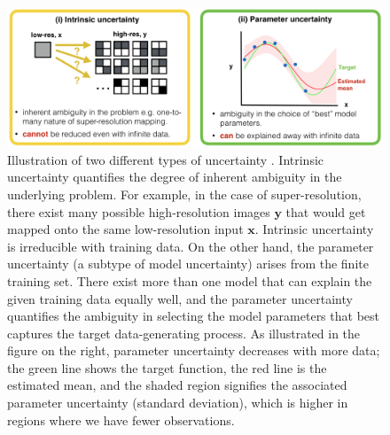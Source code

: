 \begin{figure}[t]
	\includegraphics[width=0.95\linewidth]{chapter_3/figures/fig_intro.png}
	\centering	
	\caption{Illustration of two different types of uncertainty \cite{hora1996aleatory}. Intrinsic uncertainty \cite{wang1996intrinsic} quantifies the degree of inherent ambiguity in the underlying problem. For example, in the case of super-resolution, there exist many possible high-resolution images $\textbf{y}$ that would get mapped onto the same low-resolution input $\textbf{x}$. Intrinsic uncertainty is irreducible with training data. On the other hand, the parameter uncertainty \cite{draper1995assessment} (a subtype of model uncertainty) arises from the finite training set. There exist more than one model that can explain the given training data equally well, and the parameter uncertainty quantifies the ambiguity in selecting the model parameters that best captures the target data-generating process. As illustrated in the figure on the right, parameter uncertainty decreases with more data; the green line shows the target function, the red line is the estimated mean, and the shaded region signifies the associated parameter uncertainty (standard deviation), which is higher in regions where we have fewer observations.} 
	\label{fig:uncertainty_types}
\end{figure}

